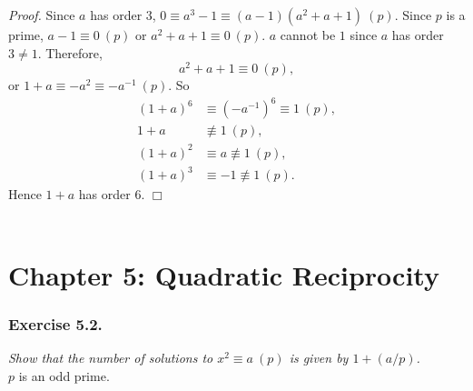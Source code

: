 \documentclass{article}
\begin{document}
\emph{Proof.}
Since $a$ has order $3$, $0 \equiv a^3 - 1 \equiv (a - 1)(a^2 + a + 1) \: (p)$.
Since $p$ is a prime, $a - 1 \equiv 0 \: (p)$ or $a^2 + a + 1 \equiv 0 \: (p)$.
$a$ cannot be $1$ since $a$ has order $3 \neq 1$.
Therefore,
$$a^2 + a + 1 \equiv 0 \: (p),$$
or
$1 + a \equiv -a^2 \equiv -a^{-1} \: (p)$.
So
\begin{align*}
(1 + a)^6 &\equiv (-a^{-1})^6 \equiv 1 \: (p), \\
1 + a     &\not\equiv 1 \: (p), \\
(1 + a)^2 &\equiv a \not\equiv 1 \: (p), \\
(1 + a)^3 &\equiv -1 \not\equiv 1 \: (p).
\end{align*}
Hence $1 + a$ has order $6$.
$\Box$ \\\\






\newpage
\section*{Chapter 5: Quadratic Reciprocity \\}






\subsubsection*{Exercise 5.2.}
\emph{Show that the number of solutions to $x^2 \equiv a \: (p)$
is given by $1 + (a/p)$.} \\

$p$ is an odd prime. \\
\end{document}
